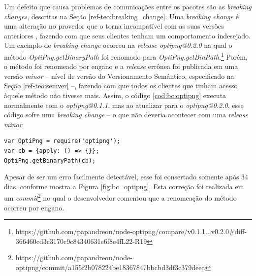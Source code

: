 Um defeito que causa problemas de comunicações entre os pacotes são as \textit{breaking changes}, descritas na Seção \ref{ref-teo:breaking_change}. Uma \textit{breaking change} é uma alteração no provedor que o torna incompatível com as suas versões anteriores \cite{intro:break_change}, fazendo com que seus clientes tenham um comportamento indesejado. Um exemplo de \textit{breaking change} ocorreu na \textit{release optipng@0.2.0} na qual o método \textit{OptiPng.getBinaryPath} foi renomado para \textit{OptiPng.getBinPath}.\footnote{https://github.com/papandreou/node-optipng/compare/v0.1.1...v0.2.0\#diff-366460cd3c3170c9c84340631e6f8e4fL22-R19} Porém, o método foi renomeado por engano e a \textit{release} errônea foi publicada em uma versão \textit{minor} -- nível de versão do Versionamento Semântico, especificado na Seção \ref{ref-teo:semver} --, fazendo com que todos os clientes que tinham acesso àquele método não tivesse mais. Assim, o código \ref{cod:bc:optipng} executa normalmente com o \textit{optipng@0.1.1}, mas ao atualizar para o \textit{optipng@0.2.0}, esse código sofre uma \textit{breaking change} -- o que não deveria acontecer com uma \textit{release minor}.

\begin{lstlisting}[style=Javascript, label=cod:bc:optipng, caption={Código que sofre \textit{breaking change} do \textit{optipng}}]
var OptiPng = require('optipng');
var cb = {apply: () => {}};
OptiPng.getBinaryPath(cb);
\end{lstlisting}

Apesar de ser um erro facilmente detectável, esse foi consertado somente após 34 dias, conforme mostra a Figura \ref{fig:bc_optipng}. Esta correção foi realizada em um \textit{commit}\footnote{https://github.com/papandreou/node-optipng/commit/a155f2b078224be18367847bbcbd3df3c379deea} no qual o desenvolvedor comentou que a renomeação do método ocorreu por engano.


